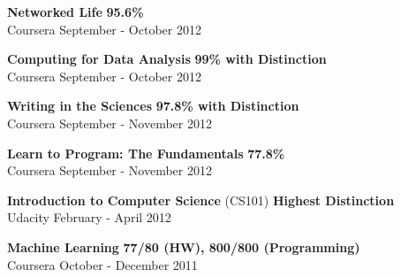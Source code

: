 \documentclass[margin,line]{resume}
\begin{document}
\begin{resume}
    \begin{list2}
	\item \textbf{Networked Life} \hspace{120mm} \textbf{95.6\%} \\ Coursera \hspace{105mm} September - October 2012
	\end{list2}
    
    \begin{list2}
	\item \textbf{Computing for Data Analysis} \hspace{70mm} \textbf{99\% with Distinction} \\ Coursera \hspace{105mm} September - October 2012
	\end{list2}

    \begin{list2}
	\item \textbf{Writing in the Sciences} \hspace{78mm} \textbf{97.8\% with Distinction} \\ Coursera \hspace{102mm} September - November 2012
	\end{list2}
    
    \begin{list2}
	\item \textbf{Learn to Program: The Fundamentals} \hspace{80mm} \textbf{77.8\%} \\ Coursera \hspace{102mm} September - November 2012
	\end{list2}
    
    \begin{list2}
	\item \textbf{Introduction to Computer Science} (CS101) \hspace{50mm} \textbf{Highest Distinction} \\ Udacity \hspace{112mm} February - April 2012
	\end{list2}

    \begin{list2}
	\item \textbf{Machine Learning} \hspace{59mm} \textbf{77/80 (HW), 800/800 (Programming)} \\ Coursera \hspace{105mm} October - December 2011
	\end{list2}
    

\end{resume}
\end{document}
